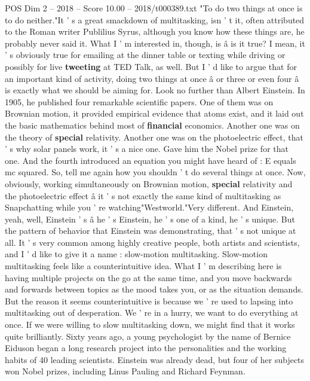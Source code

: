 \begin{textsample}{POS Dim 2 – 2018 – Score 10.00 – 2018/t000389.txt}  \label{ex:f2_pos_054}
"To do two things at once is to do neither."It ' s a great smackdown of multitasking, isn ' t it, often attributed to the Roman writer Publilius Syrus, although you know how these things are, he probably never said it.
What I ' m interested in, though, is â is it true?
I mean, it ' s obviously true for emailing at the dinner table or texting while driving or possibly for live \textbf{tweeting} at TED Talk, as well.
But I ' d like to argue that for an important kind of activity, doing two things at once â or three or even four â is exactly what we should be aiming for.
Look no further than Albert Einstein.
In 1905, he published four remarkable scientific papers.
One of them was on Brownian motion, it provided empirical evidence that atoms exist, and it laid out the basic mathematics behind most of \textbf{financial} economics.
Another one was on the theory of \textbf{special} relativity.
Another one was on the photoelectric effect, that ' s why solar panels work, it ' s a nice one.
Gave him the Nobel prize for that one.
And the fourth introduced an equation you might have heard of : E equals mc squared.
So, tell me again how you shouldn ' t do several things at once.
Now, obviously, working simultaneously on Brownian motion, \textbf{special} relativity and the photoelectric effect â it ' s not exactly the same kind of multitasking as Snapchatting while you ' re watching"Westworld."Very different.
And Einstein, yeah, well, Einstein ' s â he ' s Einstein, he ' s one of a kind, he ' s unique.
But the pattern of behavior that Einstein was demonstrating, that ' s not unique at all.
It ' s very common among highly creative people, both artists and scientists, and I ' d like to give it a name : slow-motion multitasking.
Slow-motion multitasking feels like a counterintuitive idea.
What I ' m describing here is having multiple projects on the go at the same time, and you move backwards and forwards between topics as the mood takes you, or as the situation demands.
But the reason it seems counterintuitive is because we ' re used to lapsing into multitasking out of desperation.
We ' re in a hurry, we want to do everything at once.
If we were willing to slow multitasking down, we might find that it works quite brilliantly.
Sixty years ago, a young psychologist by the name of Bernice Eiduson began a long research project into the personalities and the working habits of 40 leading scientists.
Einstein was already dead, but four of her subjects won Nobel prizes, including Linus Pauling and Richard Feynman.

\end{textsample}
